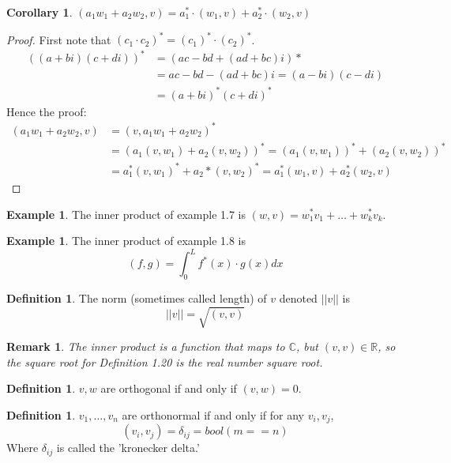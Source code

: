\documentclass[12pt]{article}
\def\R{{\mathbb{R}}}
\def\C{{\mathbb{C}}}
\newcommand{\norm}[1]{|| #1 ||}
\numberwithin{theorem}{section}
\newtheorem{remark}[theorem]{Remark}
\theoremstyle{definition}
\newtheorem{definition}[theorem]{Definition}
\newtheorem{example}[theorem]{Example}
\newtheorem{corollary}[theorem]{Corollary}
\begin{document}
\begin{corollary}
    $(a_1 w_1 + a_2 w_2, v) = a_1^* \cdot (w_1,v) + a_2^* \cdot (w_2, v)$
\end{corollary}

\begin{proof}
    First note that $(c_1\cdot c_2)^* = (c_1)^* \cdot (c_2)^*$.
    \begin{align*}
        ((a+bi)(c+di))^* &= (ac-bd + (ad+bc)i)* \\
        &= ac-bd - (ad+bc)i = (a-bi)(c-di)\\
        &= (a+bi)^* (c+di)^*
    \end{align*}
    Hence the proof:
    \begin{align*}
        (a_1 w_1 + a_2 w_2, v) &= (v, a_1 w_1 + a_2 w_2)^*\\
        &= (a_1 (v, w_1) + a_2 (v, w_2))^* = (a_1 (v, w_1))^* + (a_2 (v, w_2))^*\\
        &= a_1^* (v, w_1)^* + a_2* (v, w_2)^* = a_1^* (w_1, v) + a_2^* (w_2, v)
    \end{align*}
\end{proof}

\begin{example}
    The inner product of example 1.7 is $(w,v) = w_1^* v_1 + \dots + w_k^* v_k$.
\end{example}

\begin{example}
    The inner product of example 1.8 is
    $$(f,g) = \int_{0}^{L} f^*(x)\cdot g(x) dx$$
\end{example}

\begin{definition}
    The norm (sometimes called length) of $v$ denoted $\norm{v}$ is $$\norm{v} = \sqrt{(v,v)}$$
\end{definition}

\begin{remark}
    The inner product is a function that maps to $\C$, but $(v,v)\in\R$, so the square root for Definition 1.20 is the real number square root.
\end{remark}

\begin{definition}
    $v,w$ are orthogonal if and only if $(v,w) = 0$.
\end{definition}

\begin{definition}
    $v_1, \dots, v_n$ are orthonormal if and only if for any $v_i, v_j$,
    $$(v_i, v_j) = \delta_{ij} = bool(m==n)$$
    Where $\delta_{ij}$ is called the 'kronecker delta.'
\end{definition}
\end{document}
